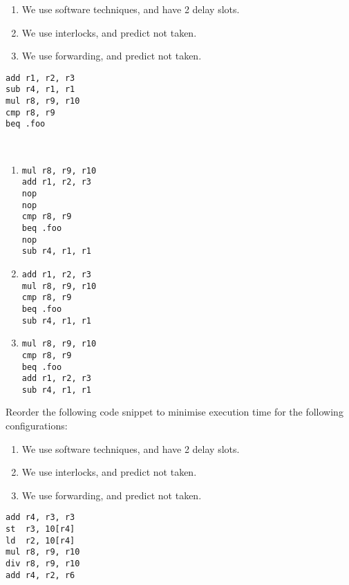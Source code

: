 \begin{ExerciseList}
\begin{enumerate}
\item We
use software techniques, and have 2 delay slots.
\item We use interlocks, and predict not taken.
\item We use forwarding, and predict not taken.
\end{enumerate}

\begin{verbatim}
add r1, r2, r3
sub r4, r1, r1
mul r8, r9, r10
cmp r8, r9
beq .foo
\end{verbatim}

\Answer
\hspace{1mm} \\
\begin{enumerate}
\item 
\begin{verbatim}
mul r8, r9, r10
add r1, r2, r3
nop
nop
cmp r8, r9
beq .foo
nop
sub r4, r1, r1
\end{verbatim}
\item 
\begin{verbatim}
add r1, r2, r3
mul r8, r9, r10
cmp r8, r9
beq .foo
sub r4, r1, r1
\end{verbatim}
\item 
\begin{verbatim}
mul r8, r9, r10
cmp r8, r9
beq .foo
add r1, r2, r3
sub r4, r1, r1
\end{verbatim}
\end{enumerate}

\Exercise 
Reorder the following code snippet to minimise execution time for the following 
configurations: 

\begin{enumerate}
\item We
use software techniques, and have 2 delay slots.
\item We use interlocks, and predict not taken.
\item We use forwarding, and predict not taken.
\end{enumerate}

\begin{verbatim}
add r4, r3, r3
st  r3, 10[r4]
ld  r2, 10[r4]
mul r8, r9, r10
div r8, r9, r10
add r4, r2, r6
\end{verbatim}


\end{ExerciseList}
